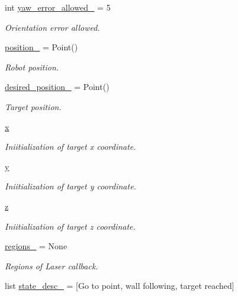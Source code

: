 \begin{DoxyCompactItemize}
int \hyperlink{namespacebug__m_a23e5e76f14d9d0d139767cb229a53dda}{yaw\+\_\+error\+\_\+allowed\+\_\+} = 5
\begin{DoxyCompactList}\small\item\em Orientation error allowed. \end{DoxyCompactList}\item 
\hyperlink{namespacebug__m_ab108d02234aa3ec58605b9f6980ec090}{position\+\_\+} = Point()
\begin{DoxyCompactList}\small\item\em Robot position. \end{DoxyCompactList}\item 
\hyperlink{namespacebug__m_a8fb60e35f164091fe3355d3a0bce95af}{desired\+\_\+position\+\_\+} = Point()
\begin{DoxyCompactList}\small\item\em Target position. \end{DoxyCompactList}\item 
\hyperlink{namespacebug__m_af10f89c7f929c9babce108f5d7382996}{x}
\begin{DoxyCompactList}\small\item\em Iniitialization of target x coordinate. \end{DoxyCompactList}\item 
\hyperlink{namespacebug__m_ab8596d2ae799585b0d89152b55891aa8}{y}
\begin{DoxyCompactList}\small\item\em Iniitialization of target y coordinate. \end{DoxyCompactList}\item 
\hyperlink{namespacebug__m_afbb54887da57b97920c8d36c6daed1fc}{z}
\begin{DoxyCompactList}\small\item\em Iniitialization of target z coordinate. \end{DoxyCompactList}\item 
\hyperlink{namespacebug__m_ac9d4d95c034fca5a2b5d08ea845bbfcb}{regions\+\_\+} = None
\begin{DoxyCompactList}\small\item\em Regions of Laser callback. \end{DoxyCompactList}\item 
list \hyperlink{namespacebug__m_ae70f71d3816862f72790fae7bfaa543b}{state\+\_\+desc\+\_\+} = \mbox{[}\textquotesingle{}Go to point\textquotesingle{}, \textquotesingle{}wall following\textquotesingle{}, \textquotesingle{}target reached\textquotesingle{}\mbox{]}

\end{DoxyCompactItemize}
